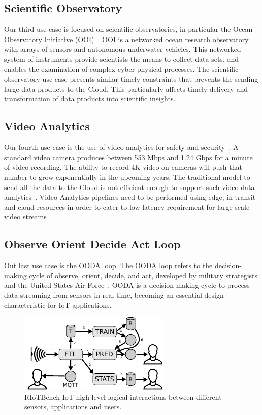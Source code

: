 \subsection{Scientific Observatory}

Our third use case is focused on scientific observatories, in particular the Ocean Observatory Initiative (OOI)~\cite{8109200}. OOI is a networked ocean research observatory with arrays of sensors and autonomous underwater vehicles. This networked system of instruments provide scientists the means to collect data sets, and enables the examination of complex cyber-physical processes. The scientific observatory use case presents similar timely constraints that prevents the sending large data products to the Cloud. This particularly affects timely delivery and transformation of data products into scientific insights.

\subsection{Video Analytics} 

Our fourth use case is the use of video analytics for safety and security~\cite{8358733}. A standard video camera produces between 553 Mbps and 1.24 Gbps for a minute of video recording.
The ability to record 4K video on cameras will push that number to grow exponentially in the upcoming years.
The traditional model to send all the data to the  Cloud is not efficient enough to support such video data analytics~\cite{7488250}. Video Analytics pipelines need to be performed using edge, in-transit and cloud resources in order to cater to low latency requirement for large-scale video streams~\cite{8057318}.

\subsection{Observe Orient Decide Act Loop}

Out last use case is the OODA loop. The \ac{OODA} loop refers to the decision-making cycle of observe, orient, decide, and act, developed by military strategists and the United States Air Force~\cite{OODA}. \ac{OODA} is a decision-making cycle to process data streaming from sensors in real time, becoming an essential design characteristic for IoT applications. 
\begin{figure}[h!]
  \centering
  \includegraphics[width=0.8\columnwidth]{Figures/ooda.pdf}
  \caption{RIoTBench IoT high-level logical interactions between different sensors, applications and users.}
  \label{fig:etl}
\end{figure}

